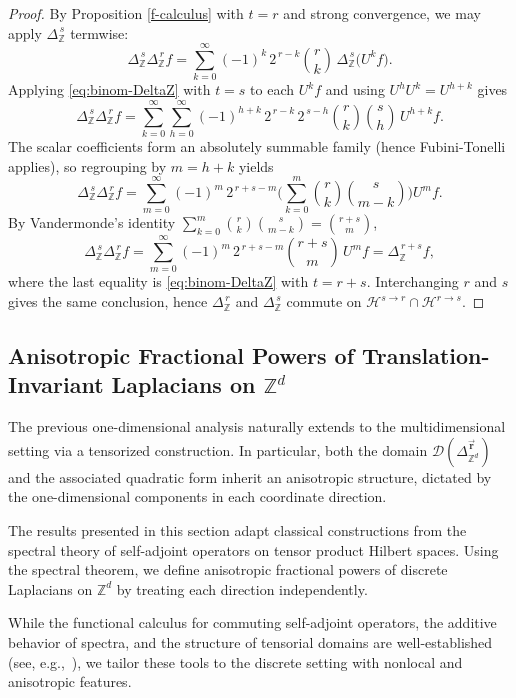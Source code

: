 \documentclass[10pt]{amsart} %
\newcommand{\1}{{\mathbb{I}}}
\newcommand{\Dc}{\mathcal{D}}
\numberwithin{equation}{section}
\begin{document}
\begin{proof}
By  Proposition \ref{f-calculus} with $t=r$ and strong convergence, we may apply $\Delta_{\mathbb{Z}}^{\,s}$ termwise:
\[
\Delta_{\mathbb{Z}}^{\,s}\Delta_{\mathbb{Z}}^{\,r} f
=\sum_{k=0}^{\infty}(-1)^k\,2^{\,r-k}\binom{r}{k}\,\Delta_{\mathbb{Z}}^{\,s}\!\big(U^{k} f\big).
\]
Applying \eqref{eq:binom-DeltaZ} with $t=s$ to each $U^k f$ and using $U^{h}U^{k}=U^{h+k}$ gives
\[
\Delta_{\mathbb{Z}}^{\,s}\Delta_{\mathbb{Z}}^{\,r} f
=\sum_{k=0}^{\infty}\sum_{h=0}^{\infty}
(-1)^{h+k}\,2^{\,r-k}\,2^{\,s-h}\binom{r}{k}\binom{s}{h}\,U^{h+k} f.
\]
The scalar coefficients form an absolutely summable family (hence Fubini-Tonelli applies), so regrouping
by $m=h+k$ yields
\[
\Delta_{\mathbb{Z}}^{\,s}\Delta_{\mathbb{Z}}^{\,r} f
=\sum_{m=0}^{\infty}(-1)^m\,2^{\,r+s-m}
\Bigg(\sum_{k=0}^{m}\binom{r}{k}\binom{s}{m-k}\Bigg) U^{m} f.
\]
By Vandermonde's identity $\displaystyle \sum_{k=0}^{m}\binom{r}{k}\binom{s}{m-k}=\binom{r+s}{m}$,
\[
\Delta_{\mathbb{Z}}^{\,s}\Delta_{\mathbb{Z}}^{\,r} f
=\sum_{m=0}^{\infty}(-1)^m\,2^{\,r+s-m}\binom{r+s}{m}\,U^{m} f
=\Delta_{\mathbb{Z}}^{\,r+s} f,
\]
where the last equality is \eqref{eq:binom-DeltaZ} with $t=r+s$. Interchanging $r$ and $s$ gives the
same conclusion, hence $\Delta_{\mathbb{Z}}^{\,r}$ and $\Delta_{\mathbb{Z}}^{\,s}$ commute on
$\mathcal{H}^{s\to r}\cap\mathcal{H}^{r\to s}$.
\end{proof}


\subsection{Anisotropic Fractional Powers of Translation-Invariant Laplacians on $\mathbb{Z}^d$}


The previous one-dimensional analysis naturally extends to the multidimensional setting via a tensorized construction. In particular, both the domain \( \Dc(\Delta_{\mathbb{Z}^d}^{\vec{\mathbf{r}}}) \) and the associated quadratic form inherit an anisotropic structure, dictated by the one-dimensional components in each coordinate direction.

The results presented in this section adapt classical constructions from the spectral theory of self-adjoint operators on tensor product Hilbert spaces. Using the spectral theorem, we define anisotropic fractional powers of discrete Laplacians on \(\mathbb{Z}^d\) by treating each direction independently.

While the functional calculus for commuting self-adjoint operators, the additive behavior of spectra, and the structure of tensorial domains are well-established (see, e.g.,~\cite{RS,Da,Ic2006}), we tailor these tools to the discrete setting with nonlocal and anisotropic features.
\end{document}
